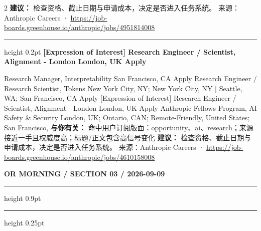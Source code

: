 \documentclass[10.5pt]{ctexart}
\begin{document}
\begin{multicols}{2}
\textbf{建议：} 检查资格、截止日期与申请成本，决定是否进入任务系统。
{\footnotesize\color{ormuted} 来源：Anthropic Careers · \url{https://job-boards.greenhouse.io/anthropic/jobs/4951814008}}
\vspace{2mm}
\hrule height 0.2pt
\vspace{2mm}
{\large\bfseries [Expression of Interest] Research Engineer / Scientist, Alignment - London London, UK Apply}\par
[Expression of Interest] Research Manager, Interpretability San Francisco, CA Apply Research Engineer / Research Scientist, Tokens New York City, NY; New York City, NY | Seattle, WA; San Francisco, CA Apply [Expression of Interest] Research Engineer / Scientist, Alignment - London London, UK Apply Anthropic Fellows Program, AI Safety \& Security London, UK; Ontario, CAN; Remote-Friendly, United States; San Francisco, 
\textbf{与你有关：} 命中用户订阅版面：opportunity、ai、research；来源接近一手且权威度高；标题/正文包含高信号变化
\textbf{建议：} 检查资格、截止日期与申请成本，决定是否进入任务系统。
{\footnotesize\color{ormuted} 来源：Anthropic Careers · \url{https://job-boards.greenhouse.io/anthropic/jobs/4610158008}}
\end{multicols}
\newpage
{\small\bfseries OR MORNING / SECTION 03 / 2026-09-09}
\vspace{2mm}
\hrule height 0.9pt
\vspace{1.5mm}
\hrule height 0.25pt
\vspace{4mm}
\end{document}
